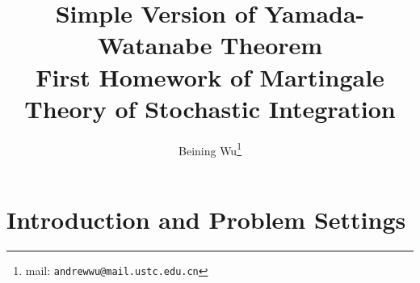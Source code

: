 \documentclass[9pt,onesided]{article}
\newcommand{\mc}{\color{BlueViolet}}
\theoremstyle{definition}
\begin{document}
{
\title{\mc Simple Version of Yamada-Watanabe Theorem\vspace*{.5em}\\  \large First Homework of Martingale Theory of Stochastic Integration }
\author{Beining Wu\footnote{mail: \texttt{andrewwu@mail.ustc.edu.cn}}}
\maketitle
}

\begin{abstract}

\end{abstract}



\section{Introduction and Problem Settings}

\end{document}
